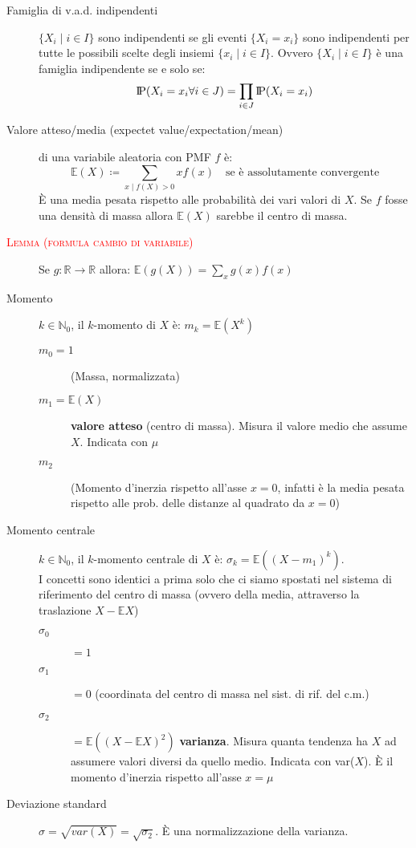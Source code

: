 \documentclass[a4paper,10pt]{article}
\newcommand{\myth}{\normalfont \scshape \textcolor{red}} %
\newcommand{\pr}{\text{I\kern-0.15em P}} %
\newcommand{\ex}{\mathbb{E}} %
\theoremstyle{remark}
\theoremstyle{definition}
\begin{document}
\begin{description}
\item[Famiglia di v.a.d. indipendenti]  $\{X_i \mid i\in I\}$ sono indipendenti se gli eventi  $\{X_i=x_i\}$ sono indipendenti per tutte le possibili scelte degli insiemi  $\{x_i\mid i\in I\}$. Ovvero $\{X_i \mid i\in I\}$ è una famiglia indipendente se e solo se:
$$\pr(X_i=x_i \forall i\in J)=\prod_{i\in J}\pr(X_i=x_i)$$

\item[Valore atteso/media (expectet value/expectation/mean)] di una variabile aleatoria con PMF $f$ è: $$\mathbb{E}(X)\coloneqq\sum_{x\mid f(X)>0}xf(x) \quad \text{se è assolutamente convergente}$$
È una media pesata rispetto alle probabilità dei vari valori di $X$. Se $f$ fosse una densità di massa allora $\mathbb{E}(X)$ sarebbe il centro di massa.

\item[\myth{Lemma (formula cambio di variabile)}] Se $g: \mathbb{R}\to\mathbb{R}$ allora: $\mathbb{E}(g(X))=\sum_xg(x)f(x)$ 

\item[Momento] $k\in\mathbb{N}_0$, il $k$-momento di $X$ è: $m_k=\mathbb{E}(X^k)$
\begin{description}
    \item[$m_0=1$] (Massa, normalizzata)
    \item[$m_1=\ex(X)$] \textbf{valore atteso} (centro di massa). Misura il valore medio che assume $X$. Indicata con $\mu$
    \item[$m_2$] (Momento d'inerzia rispetto all'asse $x=0$, infatti è la media pesata rispetto alle prob. delle distanze al quadrato da $x=0$)
\end{description}
\item[Momento centrale] $k\in\mathbb{N}_0$, il $k$-momento centrale di $X$ è: $\sigma_k=\mathbb{E}((X-m_1)^k)$. \\
I concetti sono identici a prima solo che ci siamo spostati nel sistema di riferimento del centro di massa (ovvero della media, attraverso la traslazione $X-\ex X$)
\begin{description}
    \item[$\sigma_0$] $=1$
    \item[$\sigma_1$] $=0$ (coordinata del centro di massa nel sist. di rif. del c.m.)
    \item[$\sigma_2$] $=\mathbb{E}((X-\mathbb{E}X)^2)$ \textbf{varianza}. Misura quanta tendenza ha $X$ ad assumere valori diversi da quello medio. Indicata con var($X$). È il momento d'inerzia rispetto all'asse $x=\mu$
\end{description}
\item[Deviazione standard] $\sigma=\sqrt{var(X)}=\sqrt{\sigma_2}$. È una normalizzazione della varianza.


\end{description}
\end{document}
